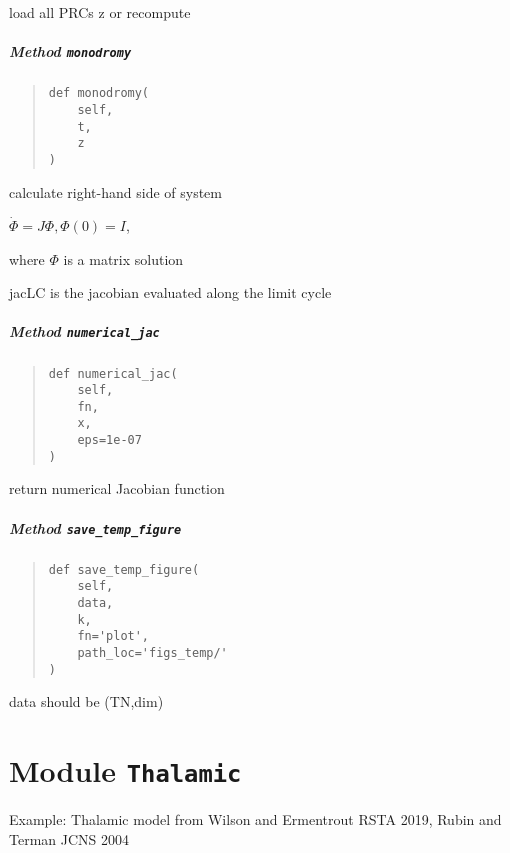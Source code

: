 \documentclass[english,a4paper,oneside]{article}
\let\oldsubparagraph\subparagraph
\renewcommand{\subparagraph}[1]{\oldsubparagraph{#1}\mbox{}}
\begin{document}
load all PRCs z or recompute

\hypertarget{nBodyCoupling.nBodyCoupling.monodromy}{%
\subparagraph{\texorpdfstring{Method
\texttt{monodromy}}{Method monodromy}}\label{nBodyCoupling.nBodyCoupling.monodromy}}

\begin{quote}
\begin{verbatim}
def monodromy(
    self,
    t,
    z
)
\end{verbatim}
\end{quote}

calculate right-hand side of system

\(\dot \Phi = J\Phi, \Phi(0)=I\),

where \(\Phi\) is a matrix solution

jacLC is the jacobian evaluated along the limit cycle

\hypertarget{nBodyCoupling.nBodyCoupling.numerical_jac}{%
\subparagraph{\texorpdfstring{Method
\texttt{numerical\_jac}}{Method numerical\_jac}}\label{nBodyCoupling.nBodyCoupling.numerical_jac}}

\begin{quote}
\begin{verbatim}
def numerical_jac(
    self,
    fn,
    x,
    eps=1e-07
)
\end{verbatim}
\end{quote}

return numerical Jacobian function

\hypertarget{nBodyCoupling.nBodyCoupling.save_temp_figure}{%
\subparagraph{\texorpdfstring{Method
\texttt{save\_temp\_figure}}{Method save\_temp\_figure}}\label{nBodyCoupling.nBodyCoupling.save_temp_figure}}

\begin{quote}
\begin{verbatim}
def save_temp_figure(
    self,
    data,
    k,
    fn='plot',
    path_loc='figs_temp/'
)
\end{verbatim}
\end{quote}

data should be (TN,dim)

\hypertarget{Thalamic}{%
\section{\texorpdfstring{Module
\texttt{Thalamic}}{Module Thalamic}}\label{Thalamic}}

Example: Thalamic model from Wilson and Ermentrout RSTA 2019, Rubin and
Terman JCNS 2004
\end{document}

